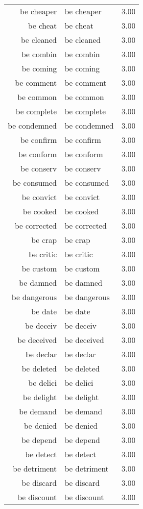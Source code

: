 \begin{table}[ht]
\begin{tabular}{rlr}
  be cheaper & be cheaper & 3.00 \\ 
  be cheat & be cheat & 3.00 \\ 
  be cleaned & be cleaned & 3.00 \\ 
  be combin & be combin & 3.00 \\ 
  be coming & be coming & 3.00 \\ 
  be comment & be comment & 3.00 \\ 
  be common & be common & 3.00 \\ 
  be complete & be complete & 3.00 \\ 
  be condemned & be condemned & 3.00 \\ 
  be confirm & be confirm & 3.00 \\ 
  be conform & be conform & 3.00 \\ 
  be conserv & be conserv & 3.00 \\ 
  be consumed & be consumed & 3.00 \\ 
  be convict & be convict & 3.00 \\ 
  be cooked & be cooked & 3.00 \\ 
  be corrected & be corrected & 3.00 \\ 
  be crap & be crap & 3.00 \\ 
  be critic & be critic & 3.00 \\ 
  be custom & be custom & 3.00 \\ 
  be damned & be damned & 3.00 \\ 
  be dangerous & be dangerous & 3.00 \\ 
  be date & be date & 3.00 \\ 
  be deceiv & be deceiv & 3.00 \\ 
  be deceived & be deceived & 3.00 \\ 
  be declar & be declar & 3.00 \\ 
  be deleted & be deleted & 3.00 \\ 
  be delici & be delici & 3.00 \\ 
  be delight & be delight & 3.00 \\ 
  be demand & be demand & 3.00 \\ 
  be denied & be denied & 3.00 \\ 
  be depend & be depend & 3.00 \\ 
  be detect & be detect & 3.00 \\ 
  be detriment & be detriment & 3.00 \\ 
  be discard & be discard & 3.00 \\ 
  be discount & be discount & 3.00 \\ 

\end{tabular}
\end{table}
